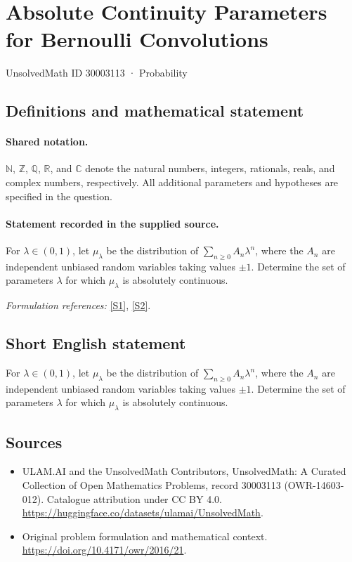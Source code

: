 \documentclass[11pt]{article}
\newcommand{\sref}[2]{\hyperlink{source:#1:#2}{[S#2]}}
\begin{document}
\setcounter{section}{30003112}
\section{Absolute Continuity Parameters for Bernoulli Convolutions}\label{30003113}
{\small UnsolvedMath ID 30003113 · Probability}
\subsection{Definitions and mathematical statement}

\paragraph{Shared notation.}$\mathbb N$, $\mathbb Z$, $\mathbb Q$, $\mathbb R$, and $\mathbb C$ denote the natural numbers, integers, rationals, reals, and complex numbers, respectively. All additional parameters and hypotheses are specified in the question.


\paragraph{Statement recorded in the supplied source.}
For $\lambda\in(0,1)$, let $\mu_\lambda$ be the distribution of $\sum_{n\geq0}A_n\lambda^n$, where the $A_n$ are independent unbiased random variables taking values $\pm1$. Determine the set of parameters $\lambda$ for which $\mu_\lambda$ is absolutely continuous.
\par\smallskip\textit{Formulation references:} \sref{30003113}{1}, \sref{30003113}{2}.
\subsection{Short English statement}
For $\lambda\in(0,1)$, let $\mu_\lambda$ be the distribution of $\sum_{n\geq0}A_n\lambda^n$, where the $A_n$ are independent unbiased random variables taking values $\pm1$. Determine the set of parameters $\lambda$ for which $\mu_\lambda$ is absolutely continuous.
\subsection{Sources}
\begin{itemize}
\item[\hypertarget{source:30003113:1}{S1}] ULAM.AI and the UnsolvedMath Contributors, UnsolvedMath: A Curated Collection of Open Mathematics Problems, record 30003113 (OWR-14603-012). Catalogue attribution under CC BY 4.0.
\url{https://huggingface.co/datasets/ulamai/UnsolvedMath}.
\item[\hypertarget{source:30003113:2}{S2}] Original problem formulation and mathematical context.
\url{https://doi.org/10.4171/owr/2016/21}.
\end{itemize}
\label{end:30003113}
\end{document}
